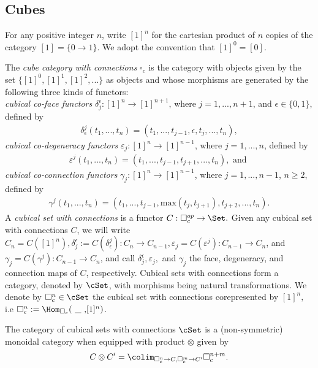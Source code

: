 
\subsection{Cubes}

For any positive integer $n$, write $[1]^n$ for the cartesian product of $n$ copies of the category $[1]=\{0 \to 1\}$. We adopt the convention that $[1]^0=[0]$. 

The \textit{cube category with connections} $\square_c$ is the category with objects given by the set $\{[1]^0, [1]^1, [1]^2,...\}$ as objects and whose morphisms are generated by the following three kinds of functors:
\\
\textit{cubical co-face functors} $\delta^{\epsilon}_{j}: [1]^n \to [1]^{n+1}$, where $j=1,...,n+1$, and $\epsilon \in \{0,1\}$, defined by
\begin{eqnarray*}
\delta^{j}_{\epsilon}(t_1,...,t_n)=(t_1,...,t_{j-1},\epsilon,t_j,...,t_n),
\end{eqnarray*}
\textit{cubical co-degeneracy functors} $\varepsilon_{j}: [1]^n \to [1]^{n-1}$, where $j=1,...,n$, defined by
\begin{eqnarray*}
\varepsilon^{j}(t_1,...,t_n)=(t_1,...,t_{j-1},t_{j+1},...,t_n), \text{ and }
\end{eqnarray*}
\textit{cubical co-connection functors} $\gamma_{j}: [1]^n \to [1]^{n-1}$, where $j=1,...,n-1$, $n\geq 2$, defined by
\begin{eqnarray*}
\gamma^{j}(t_1,...,t_n)=(t_1,...,t_{j-1},\text{max}(t_j,t_{j+1}),t_{j+2},...,t_n).
\end{eqnarray*}
A \textit{cubical set with connections} is a functor $C: \square_c^{op} \to \Set.$ Given any cubical set with connections $C$, we will write $C_n= C( [1]^n ), \delta^{\epsilon}_j := C( \delta^{j}_{\epsilon}): C_n \to C_{n-1}, \varepsilon_j=C(\varepsilon^j): C_{n-1} \to C_n$, and $\gamma_j=C(\gamma^j): C_{n-1} \to C_n$, and call $\delta^{\epsilon}_j, \varepsilon_j,$ and $\gamma_j$ the face, degeneracy, and connection maps of $C$, respectively. Cubical sets with connections form a category, denoted by $\cSet$, with morphisms being natural transformations. We denote by $\square_c^n \in \cSet$ the cubical set with connections corepresented by $[1]^n,$ i.e $\square_c^n:= \Hom_{\square_c}(\text{ \_ ,}[1]^n)$. 

The category of cubical sets with connections $\cSet$ is a (non-symmetric) monoidal category when equipped with product $\otimes$ given by $$C \otimes C' = \colim_{\square^n_c \to C, \square^m_c \to C'} \square^{n+m}_c.$$

